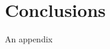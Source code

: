 \documentclass[preprint, 10pt]{elsarticle}
\begin{document}
\section{Conclusions\label{s:conclusions}}


\begin{appendices}
An appendix
\end{appendices}


 

\end{document}
